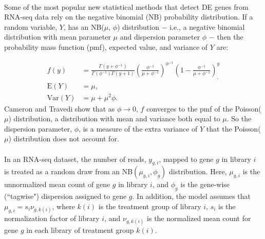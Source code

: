 \documentclass[10pt]{article}
\providecommand{\nv}{{}^{-1}}
\providecommand{\rt}{\rightarrow}
\begin{document}
\paragraph{} \indent Some of the most popular new statistical methods that detect DE genes from RNA-seq data rely on the negative binomial (NB) probability distribution. If a random variable, $Y$, has an NB($\mu$, $\phi$) distribution $-$ i.e., a negative binomial distribution with mean parameter $\mu$ and dispersion parameter $\phi$ $-$ then the probability mass function (pmf), expected value, and variance of $Y$ are:

\begin{align*}
f(y) &= \frac{\Gamma(y+ \phi \nv)}{\Gamma(\phi \nv) \Gamma(y + 1)} \left ( \frac{\phi \nv}{\mu + \phi \nv} \right ) ^{\phi \nv} \left ( 1 - \frac{\phi \nv}{\mu + \phi \nv} \right )^ {y}_, \\
\text{E}(Y) &= \mu, \\
\text{Var}(Y) &= \mu + \mu^2 \phi.
\end{align*}
%
Cameron and Travedi \cite{travedi} show that as $\phi \rt 0$, $f$ converges to the pmf of the Poisson($\mu$) distribution, a distribution with mean and variance both equal to $\mu$. So the dispersion parameter, $\phi$, is a measure of the extra variance of $Y$ that the Poisson($\mu$) distribution does not account for.

\paragraph{} \indent In an RNA-seq dataset, the number of reads, $y_{g, i}$, mapped to gene $g$ in library $i$ is treated as a random draw from an NB$(\mu_{g, i}, \phi_g)$ distribution. Here, $\mu_{g, i}$ is the unnormalized mean count of gene $g$ in library $i$, and $\phi_g$ is the gene-wise (``tagwise") dispersion assigned to gene $g$. In addition, the model assumes that $\mu_{g, i} = s_i \nu_{g, k(i)}$, where $k(i)$ is the treatment group of library $i$, $s_i$ is the normalization factor of library $i$, and $\nu_{g, k(i)}$ is the normalized mean count for gene $g$ in each library of treatment group $k(i)$.
\end{document}
